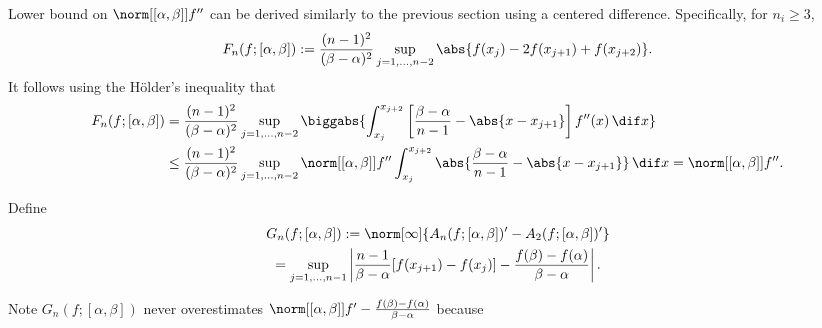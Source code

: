 \documentclass[]{elsarticle}
\theoremstyle{definition}
\theoremstyle{remark}
\begin{document}
Lower bound on $\norm[{[\alpha,\beta]}]{f''}$ can be derived similarly to the previous section using a centered difference.  Specifically, for $n_i \ge 3$,
\begin{equation} \label{Fnormappxalg}
F_{n}(f;[\alpha,\beta]) := \frac{(n-1)^2}{(\beta-\alpha)^2}\sup_{j=1, \ldots, n-2} \abs{f(x_j) - 2 f(x_{j+1})+f(x_{j+2})}.
\end{equation}
It follows using the H\"older's inequality that
\begin{align*}
F_{n}(f;[\alpha,\beta]) &= \frac{(n-1)^2}{(\beta-\alpha)^2}\sup_{j=1, \ldots, n-2}  \biggabs{\int_{x_j}^{x_{j+2}} \left[\frac{\beta-\alpha}{n-1} - \abs{x-x_{j+1}}\right] f''(x) \, \dif x} \\
&\le\frac{(n-1)^2}{(\beta-\alpha)^2}\sup_{j=1, \ldots, n-2}  \norm[{[\alpha,\beta]}]{f''} \int_{x_j}^{x_{j+2}} \abs{\frac{\beta-\alpha}{n-1} - \abs{x-x_{j+1}}} \, \dif x = \norm[{[\alpha,\beta]}]{f''}.
\end{align*}


Define\begin{multline}\label{estfirstderiv}
G_n(f;[\alpha,\beta]) := \norm[\infty]{A_{n}(f;[\alpha,\beta])' - A_2(f;[\alpha,\beta])'} \\
= \sup_{j=1, \ldots, n-1} \left|\frac{n-1}{\beta-\alpha} [f(x_{j+1})-f(x_j)]-\frac{f(\beta)-f(\alpha)}{\beta-\alpha}\right|.
\end{multline}

Note $G_n(f;[\alpha,\beta])$ never overestimates $\norm[{[\alpha, \beta]}]{f'-\frac{f(\beta)-f(\alpha)}{\beta-\alpha}}$ because
\end{document}
